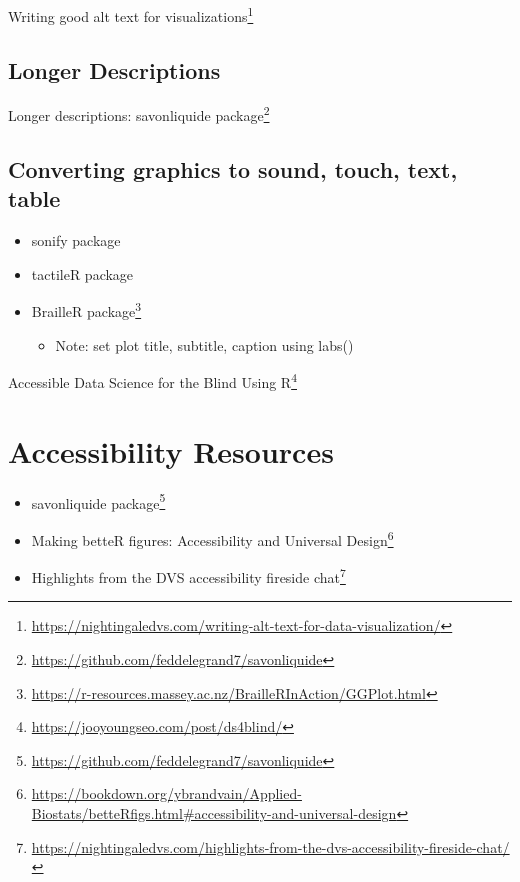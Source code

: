 \documentclass[
]{krantz}
\providecommand{\tightlist}{%
  \setlength{\itemsep}{0pt}\setlength{\parskip}{0pt}}
\renewcommand{\href}[2]{#2\footnote{\url{#1}}}
\begin{document}
\href{https://nightingaledvs.com/writing-alt-text-for-data-visualization/}{Writing good alt text for visualizations}

\hypertarget{longer-descriptions}{%
\subsection{Longer Descriptions}\label{longer-descriptions}}

Longer descriptions: \href{https://github.com/feddelegrand7/savonliquide}{savonliquide package}

\hypertarget{converting-graphics-to-sound-touch-text-table}{%
\subsection{Converting graphics to sound, touch, text, table}\label{converting-graphics-to-sound-touch-text-table}}

\begin{itemize}
\item
  sonify package
\item
  tactileR package
\item
  \href{https://r-resources.massey.ac.nz/BrailleRInAction/GGPlot.html}{BrailleR package}

  \begin{itemize}
  \tightlist
  \item
    Note: set plot title, subtitle, caption using labs()
  \end{itemize}
\end{itemize}

\href{https://jooyoungseo.com/post/ds4blind/}{Accessible Data Science for the Blind Using R}

\hypertarget{accessibility-resources}{%
\section{Accessibility Resources}\label{accessibility-resources}}

\begin{itemize}
\item
  \href{https://github.com/feddelegrand7/savonliquide}{savonliquide package}
\item
  \href{https://bookdown.org/ybrandvain/Applied-Biostats/betteRfigs.html\#accessibility-and-universal-design}{Making betteR figures: Accessibility and Universal Design}
\item
  \href{https://nightingaledvs.com/highlights-from-the-dvs-accessibility-fireside-chat/}{Highlights from the DVS accessibility fireside chat}
\end{itemize}
\end{document}
